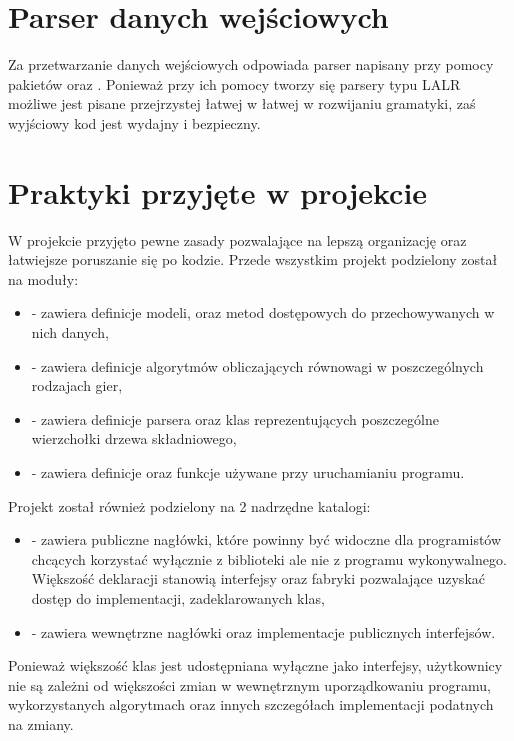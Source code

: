 \documentclass{standalone}
\begin{document}
\section{Parser danych wejściowych}

Za przetwarzanie danych wejściowych odpowiada parser napisany przy pomocy pakietów  oraz . Ponieważ przy ich
pomocy tworzy się parsery typu LALR możliwe jest pisane przejrzystej łatwej w łatwej w rozwijaniu gramatyki, zaś wyjściowy kod jest
wydajny i bezpieczny.

\section{Praktyki przyjęte w projekcie}

W projekcie przyjęto pewne zasady pozwalające na lepszą organizację oraz łatwiejsze poruszanie się po kodzie. Przede wszystkim
projekt podzielony został na moduły:
\begin{itemize}
\item {} - zawiera definicje modeli, oraz metod dostępowych do przechowywanych w nich danych,
\item {} - zawiera definicje algorytmów obliczających równowagi w poszczególnych rodzajach gier,
\item {} - zawiera definicje parsera oraz klas reprezentujących poszczególne wierzchołki drzewa składniowego,
\item {} - zawiera definicje oraz funkcje używane przy uruchamianiu programu.
\end{itemize}

Projekt został również podzielony na 2 nadrzędne katalogi:
\begin{itemize}
\item {} - zawiera publiczne nagłówki, które powinny być widoczne dla programistów chcących korzystać wyłącznie z biblioteki
ale nie z programu wykonywalnego. Większość deklaracji stanowią interfejsy oraz fabryki pozwalające uzyskać dostęp do implementacji,
zadeklarowanych klas,
\item {} - zawiera wewnętrzne nagłówki oraz implementacje publicznych interfejsów.
\end{itemize}
Ponieważ większość klas jest udostępniana wyłączne jako interfejsy, użytkownicy nie są zależni od większości zmian w wewnętrznym uporządkowaniu
programu, wykorzystanych algorytmach oraz innych szczegółach implementacji podatnych na zmiany.
\end{document}
